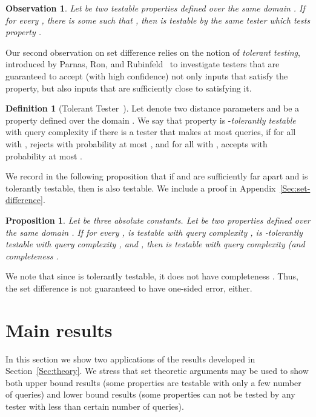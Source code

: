 \documentclass[11pt,english]{article}
\newtheorem{obs}{Observation}
\newtheorem{prop}{Proposition}
\theoremstyle{definition}
\newtheorem{defn}{Definition}
\theoremstyle{remark}
\begin{document}
\begin{obs}\label{obs:set-difference} 
Let  be two testable properties 
defined over the same domain .
If for every , 
there is some  such that ,
then  is testable by the same tester which tests property
. 
\end{obs} 

Our second observation on set difference relies on the notion of \emph{tolerant
testing}, introduced by Parnas, Ron, and Rubinfeld~\cite{PRR06}
to investigate testers that are guaranteed to accept (with high confidence)
not only inputs that satisfy the property, but also inputs that are
sufficiently close to satisfying it. 

\begin{defn}[Tolerant Tester~\cite{PRR06}]
Let  denote two distance parameters and
 be a property defined 
over the domain .
We say that property  is -\emph{tolerantly testable} 
with query complexity  
if there is a tester  that makes at most  queries,
if for all  with ,  rejects 
with probability at most , and for all  with ,
 accepts  with probability at most . 
\end{defn}

We record in the following proposition that if  and
 are sufficiently far apart and 
is tolerantly testable, then  is also testable. We include
a proof in Appendix~\ref{Sec:set-difference}.

\begin{prop}\label{thm:set-difference} 
Let  be three absolute constants.
Let  
be two properties defined over the same domain .
If for every ,  is testable with query complexity , 
 is -tolerantly testable with query complexity , 
and , 
then  is testable 
with query complexity  (and completeness .
\end{prop} 

We note that since  is tolerantly testable, 
it does not have completeness . 
Thus, the set difference  
is not guaranteed to have one-sided error, either.



\section{\texorpdfstring{Main results}{4. Main results}}

\label{Sec:applications} In this section we show two applications
of the results developed in Section~\ref{Sec:theory}. We stress
that set theoretic arguments may be used to show both upper bound
results (some properties are testable with only a few number of queries)
and lower bound results (some properties can not be tested by any
tester with less than certain number of queries).
\end{document}
